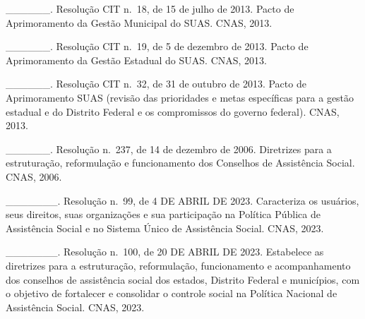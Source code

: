 \documentclass[
  brazilian]{report}
\begin{document}
\_\_\_\_\_\_. Resolução CIT n.~18, de 15 de julho de 2013. Pacto de
Aprimoramento da Gestão Municipal do SUAS. CNAS, 2013.

\_\_\_\_\_\_. Resolução CIT n.~19, de 5 de dezembro de 2013. Pacto de
Aprimoramento da Gestão Estadual do SUAS. CNAS, 2013.

\_\_\_\_\_\_. Resolução CIT n.~32, de 31 de outubro de 2013. Pacto de
Aprimoramento SUAS (revisão das prioridades e metas específicas para a
gestão estadual e do Distrito Federal e os compromissos do governo
federal). CNAS, 2013.

\_\_\_\_\_\_. Resolução n.~237, de 14 de dezembro de 2006. Diretrizes
para a estruturação, reformulação e funcionamento dos Conselhos de
Assistência Social. CNAS, 2006.

\_\_\_\_\_\_\_. Resolução n.~99, de 4 DE ABRIL DE 2023. Caracteriza os
usuários, seus direitos, suas organizações e sua participação na
Política Pública de Assistência Social e no Sistema Único de Assistência
Social. CNAS, 2023.

\_\_\_\_\_\_\_. Resolução n.~100, de 20 DE ABRIL DE 2023. Estabelece as
diretrizes para a estruturação, reformulação, funcionamento e
acompanhamento dos conselhos de assistência social dos estados, Distrito
Federal e municípios, com o objetivo de fortalecer e consolidar o
controle social na Política Nacional de Assistência Social. CNAS, 2023.
\end{document}
